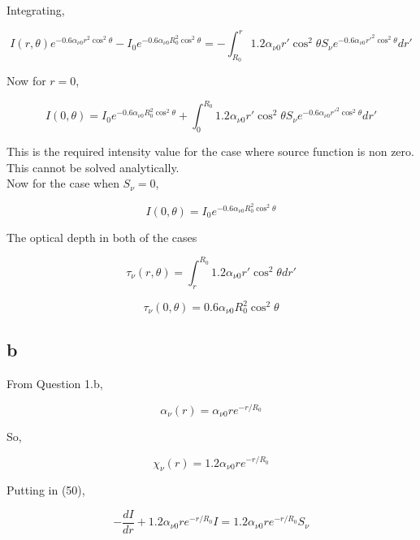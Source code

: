 \documentclass{article}
\begin{document}
Integrating,

\begin{equation}
I(r,\theta)e^{-0.6\alpha_{\nu0} r^2\cos^2\theta}
-
I_0 e^{-0.6\alpha_{\nu0} R_0^2\cos^2\theta}
=
-
\int_{R_0}^{r}
1.2\alpha_{\nu0} r'\cos^2\theta S_\nu
e^{-0.6\alpha_{\nu0} r'^2\cos^2\theta}dr'
\end{equation}

Now for $r=0$,

\begin{equation}
\boxed{
I(0,\theta)
=
I_0 e^{-0.6\alpha_{\nu0} R_0^2\cos^2\theta}
+
\int_0^{R_0}
1.2\alpha_{\nu0} r'\cos^2\theta S_\nu
e^{-0.6\alpha_{\nu0} r'^2\cos^2\theta}dr'
}
\end{equation}

This is the required intensity value for the case where source function is non zero.
This cannot be solved analytically.\\

Now for the case when $S_\nu=0$,

\begin{equation}
\boxed{
I(0,\theta)=I_0 e^{-0.6\alpha_{\nu0} R_0^2\cos^2\theta}
}
\end{equation}

The optical depth in both of the cases

\begin{equation}
\tau_\nu(r,\theta)=\int_r^{R_0}1.2\alpha_{\nu0} r'\cos^2\theta dr'
\end{equation}

\begin{equation}
\boxed{
\tau_\nu(0,\theta)=0.6\alpha_{\nu0}R_0^2\cos^2\theta
}
\end{equation}

\subsection{b}

From Question 1.b,

\begin{equation}
\alpha_\nu(r)=\alpha_{\nu0} r e^{-r/R_0}
\end{equation}

So,

\begin{equation}
\chi_\nu(r)=1.2\alpha_{\nu0} r e^{-r/R_0}
\end{equation}

Putting in (50),

\begin{equation}
-\frac{dI}{dr}+1.2\alpha_{\nu0} r e^{-r/R_0} I
=
1.2\alpha_{\nu0} r e^{-r/R_0} S_\nu
\end{equation}
\end{document}

